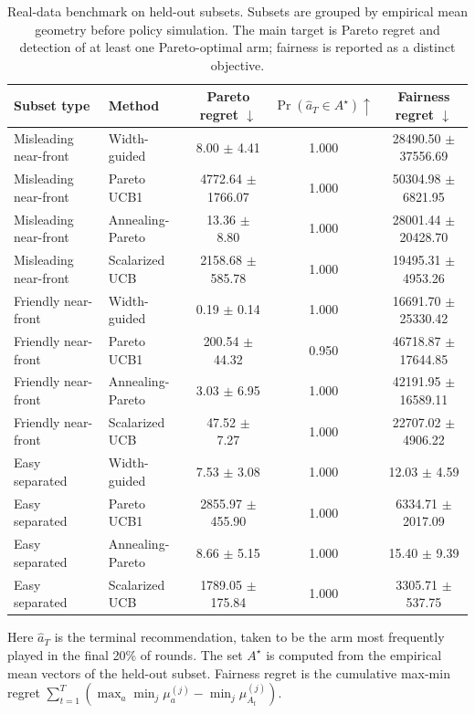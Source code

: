 \begin{table}[t]
\centering
\caption{Real-data benchmark on held-out subsets. Subsets are grouped by empirical mean geometry before policy simulation. The main target is Pareto regret and detection of at least one Pareto-optimal arm; fairness is reported as a distinct objective.}
\label{tab:real-main}
\scriptsize
\setlength{\tabcolsep}{3pt}
\begin{tabular}{llccc}
\toprule
Subset type & Method & Pareto regret $\downarrow$ & $\Pr(\widehat a_T\in A^\star)\uparrow$ & Fairness regret $\downarrow$ \\
\midrule
Misleading near-front & Width-guided & 8.00 $\pm$ 4.41 & 1.000 & 28490.50 $\pm$ 37556.69 \\
Misleading near-front & Pareto UCB1 & 4772.64 $\pm$ 1766.07 & 1.000 & 50304.98 $\pm$ 6821.95 \\
Misleading near-front & Annealing-Pareto & 13.36 $\pm$ 8.80 & 1.000 & 28001.44 $\pm$ 20428.70 \\
Misleading near-front & Scalarized UCB & 2158.68 $\pm$ 585.78 & 1.000 & 19495.31 $\pm$ 4953.26 \\
\midrule
Friendly near-front & Width-guided & 0.19 $\pm$ 0.14 & 1.000 & 16691.70 $\pm$ 25330.42 \\
Friendly near-front & Pareto UCB1 & 200.54 $\pm$ 44.32 & 0.950 & 46718.87 $\pm$ 17644.85 \\
Friendly near-front & Annealing-Pareto & 3.03 $\pm$ 6.95 & 1.000 & 42191.95 $\pm$ 16589.11 \\
Friendly near-front & Scalarized UCB & 47.52 $\pm$ 7.27 & 1.000 & 22707.02 $\pm$ 4906.22 \\
\midrule
Easy separated & Width-guided & 7.53 $\pm$ 3.08 & 1.000 & 12.03 $\pm$ 4.59 \\
Easy separated & Pareto UCB1 & 2855.97 $\pm$ 455.90 & 1.000 & 6334.71 $\pm$ 2017.09 \\
Easy separated & Annealing-Pareto & 8.66 $\pm$ 5.15 & 1.000 & 15.40 $\pm$ 9.39 \\
Easy separated & Scalarized UCB & 1789.05 $\pm$ 175.84 & 1.000 & 3305.71 $\pm$ 537.75 \\
\bottomrule
\end{tabular}
\vspace{2pt}
\begin{minipage}{0.98\linewidth}
\scriptsize
Here $\widehat a_T$ is the terminal recommendation, taken to be the arm most frequently played in the final 20\% of rounds. The set $A^\star$ is computed from the empirical mean vectors of the held-out subset. Fairness regret is the cumulative max-min regret $\sum_{t=1}^T (\max_a \min_j \mu_a^{(j)} - \min_j \mu_{A_t}^{(j)})$.
\end{minipage}
\end{table}
